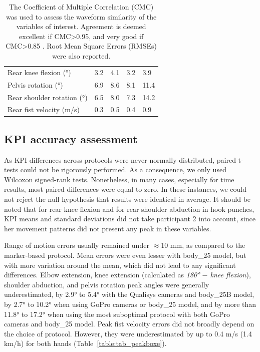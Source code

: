 \begin{table}[!ht]
{\begin{tabular}{lllll}
          \cmidrule(l{2pt}r{2pt}){2-5}
          Rear knee flexion (°) & 3.2 & 4.1 & 3.2 & 3.9\\
          Pelvis rotation (°) & 6.9 & 8.6 & 8.1 & 11.4\\
          Rear shoulder rotation (°) & 6.5 & 8.0 & 7.3 & 14.2 \\
          Rear fist velocity (m/s) & 0.3 & 0.5 & 0.4 & 0.9\\
          \bottomrule
      \end{tabular}}
      \caption{The Coefficient of Multiple Correlation (CMC) was used to assess the waveform similarity of the variables of interest. Agreement is deemed excellent if CMC>0.95, and very good if CMC>0.85 \cite{Ferrari2010}. Root Mean Square Errors (RMSEs) were also reported.}
      \label{table:tab_cmcboxe}
\end{table}


\subsection{KPI accuracy assessment}

As KPI differences across protocols were never normally distributed, paired t-tests could not be rigorously performed. As a consequence, we only used Wilcoxon signed-rank tests. Nonetheless, in many cases, especially for time results, most paired differences were equal to zero. In these instances, we could not reject the null hypothesis that results were identical in average. It should be noted that for rear knee flexion and for rear shoulder abduction in hook punches, KPI means and standard deviations did not take participant 2 into account, since her movement patterns did not present any peak in these variables.

Range of motion errors usually remained under $\approx$10 mm, as compared to the marker-based protocol. Mean errors were even lesser with body\_25 model, but with more variation around the mean, which did not lead to any significant differences. Elbow extension, knee extension (calculated as \textit{180° $-$ knee flexion}), shoulder abduction, and pelvis rotation peak angles were generally underestimated, by 2.9° to 5.4° with the Qualisys cameras and body\_25B model, by 2.7° to 10.2° when using GoPro cameras or body\_25 model, and by more than 11.8° to 17.2° when using the most suboptimal protocol with both GoPro cameras and body\_25 model. Peak fist velocity errors did not broadly depend on the choice of protocol. However, they were underestimated by up to 0.4 m/s (1.4 km/h) for both hands (Table~\ref{table:tab_peakboxe}).

